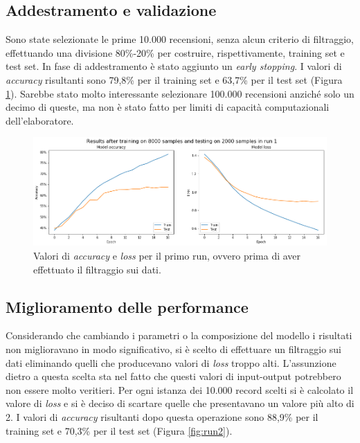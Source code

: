 \documentclass[12pt]{article}
\begin{document}
\subsection{Addestramento e validazione}
Sono state selezionate le prime 10.000 recensioni, senza alcun criterio di filtraggio, effettuando una divisione 80\%-20\% per costruire, rispettivamente, training set e test set. In fase di addestramento è stato aggiunto un \textit{early stopping}. \newline
I valori di \textit{accuracy} risultanti sono 79,8\% per il training set e   63,7\% per il test set (Figura \ref{fig:run1}).
Sarebbe stato molto interessante selezionare 100.000 recensioni anziché solo un decimo di queste, ma non è stato fatto per limiti di capacità computazionali dell'elaboratore.

\begin{figure}[H]
\centering
\includegraphics[width=\textwidth]{images/accuracy_loss_run1.png}
\caption{Valori di \textit{accuracy} e \textit{loss} per il primo run, ovvero prima di aver effettuato il filtraggio sui dati.}
\label{fig:run1}
\end{figure}

\subsection{Miglioramento delle performance}
Considerando che cambiando i parametri o la composizione del modello i risultati non miglioravano in modo significativo, si è scelto di effettuare un filtraggio sui dati eliminando quelli che producevano valori di \textit{loss} troppo alti. L'assunzione dietro a questa scelta sta nel fatto che questi valori di input-output potrebbero non essere molto veritieri.\newline
Per ogni istanza dei 10.000 record scelti si è calcolato il valore di \textit{loss} e si è deciso di scartare quelle che presentavano un valore più alto di 2. \newline
I valori di \textit{accuracy} risultanti dopo questa operazione sono 88,9\% per il training set e 70,3\% per il test set (Figura \ref{fig:run2}).
\end{document}
